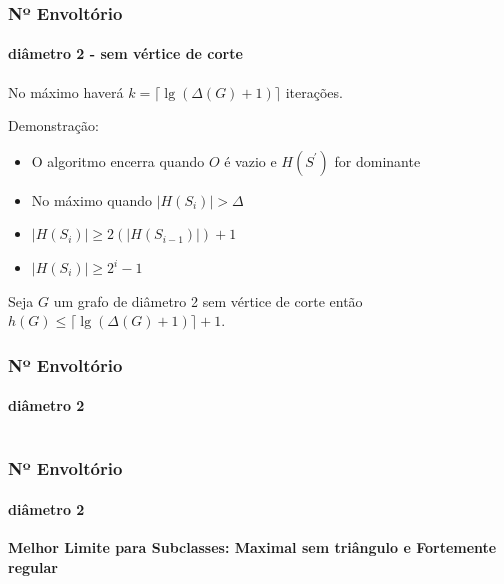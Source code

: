 \begin{frame}
\frametitle{Nº Envoltório}
\framesubtitle{diâmetro 2 - sem vértice de corte}
\begin{proposition} 
    No máximo haverá $k= \Big\lceil \lg{(\Delta(G) + 1)} \Big\rceil$ iterações.
\end{proposition}
Demonstração:
\begin{itemize}
    \item O algoritmo encerra quando $O$ é vazio e $H(S^\prime)$ for dominante
    \item No máximo quando $|H(S_i)| > \Delta$
    \item $|H(S_i)|\geq 2 (|H(S_{i-1})|)+1$
    \item $|H(S_i)|\geq 2^i-1$

\end{itemize}
\begin{coro}
Seja $G$ um grafo de diâmetro 2 sem vértice de corte então $h(G) \le \Big\lceil \lg{(\Delta(G) + 1)} \Big\rceil + 1$.
\label{coro-env-gd2}
\end{coro}
\end{frame}

\begin{frame}
\frametitle{Nº Envoltório}
\framesubtitle{diâmetro 2}
\centering
\begin{columns}[T]
\begin{column}{.4\textwidth}
\end{column}
\begin{column}{.4\textwidth}
\end{column}
\end{columns}
\end{frame}



\begin{frame}
\frametitle{Nº Envoltório}
\framesubtitle{diâmetro 2}
\centering
\textbf{Melhor Limite para Subclasses: Maximal sem triângulo e Fortemente regular}
\end{frame}



